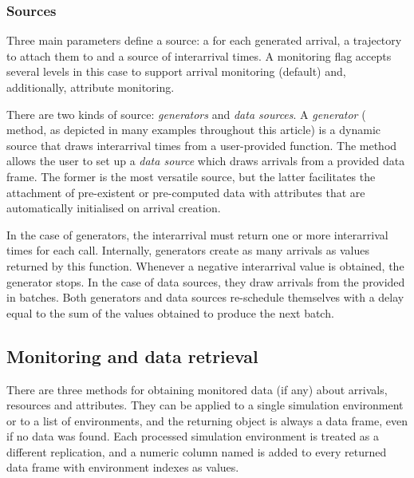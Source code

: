 \documentclass[
  nojss]{jss}
\begin{document}
\hypertarget{sources}{%
\subsubsection{Sources}\label{sources}}

Three main parameters define a source: a  for each
generated arrival, a trajectory to attach them to and a source of
interarrival times. A monitoring flag accepts several levels in this
case to support arrival monitoring (default) and, additionally,
attribute monitoring.

There are two kinds of source: \emph{generators} and \emph{data
sources}. A \emph{generator} ( method, as depicted
in many examples throughout this article) is a dynamic source that draws
interarrival times from a user-provided function. The
 method allows the user to set up a \emph{data
source} which draws arrivals from a provided data frame. The former is
the most versatile source, but the latter facilitates the attachment of
pre-existent or pre-computed data with attributes that are automatically
initialised on arrival creation.

In the case of generators, the interarrival  must
return one or more interarrival times for each call. Internally,
generators create as many arrivals as values returned by this function.
Whenever a negative interarrival value is obtained, the generator stops.
In the case of data sources, they draw arrivals from the 
provided in batches. Both generators and data sources re-schedule
themselves with a delay equal to the sum of the values obtained to
produce the next batch.

\hypertarget{monitoring-and-data-retrieval}{%
\subsection{Monitoring and data
retrieval}\label{monitoring-and-data-retrieval}}

There are three methods for obtaining monitored data (if any) about
arrivals, resources and attributes. They can be applied to a single
simulation environment or to a list of environments, and the returning
object is always a data frame, even if no data was found. Each processed
simulation environment is treated as a different replication, and a
numeric column named  is added to every returned data
frame with environment indexes as values.
\end{document}
